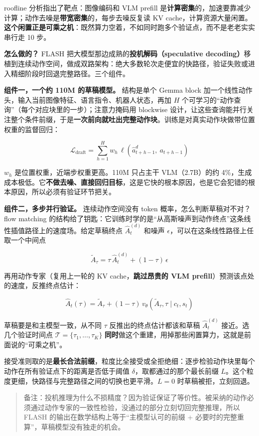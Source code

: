 \documentclass[
  chinese,
]{ctexart}
\begin{document}
roofline 分析指出了靶点：图像编码和 VLM prefill
是\textbf{计算密集}的，加速要靠减少计算；动作去噪是\textbf{带宽密集}的，每步去噪反复读
KV
cache，计算资源大量闲置。\textbf{这个闲置正是可乘之机}：既然算力空着，不如同时跑多个验证点，而不是老老实实串行走
10 步。

\textbf{怎么做的？} FLASH
把大模型那边成熟的\textbf{投机解码（speculative
decoding）}移植到连续动作空间，做成双路架构：绝大多数轮次走便宜的快路径，验证失败或进入精细阶段时回退完整路径。三个组件。

\textbf{组件一，一个约 110M 的草稿模型。} 结构是单个 Gemma block
加一个线性动作头，输入当前图像特征、语言指令、机器人状态，再加 \(H\)
个可学习的``动作查询''（每个对应块里的一步）；注意力掩码用 blockwise
设计，让这些查询能并行关注整个条件前缀，于是\textbf{一次前向就吐出完整动作块}。训练是对真实动作块做带位置权重的监督回归：

\[\mathcal{L}_{\mathrm{draft}} = \sum_{h=1}^{H} w_h\,\ell\!\left(\hat{a}_{t+h-1}^{d},\ a_{t+h-1}\right)\]

\(w_h\) 是位置权重，近端步权重更高。110M 只占主干 VLM（2.7B）的约
4\%，生成成本极低。它\textbf{不做去噪、直接回归目标}，这是它快的根本原因，也是它会犯错的根本原因，所以必须有验证环节把关。

\textbf{组件二，多步并行验证。} 连续动作空间没有 token
概率，怎么判断草稿对不对？flow matching
的结构给了钥匙：它训练时学的是``从高斯噪声到动作终点''这条线性插值路径上的速度场。给定草稿终点
\(\hat{A}_t^{(d)}\) 和噪声
\(\epsilon\)，可以在这条线性路径上任取一个中间点

\[\tilde{A}_\tau = \tau\,\hat{A}_t^{(d)} + (1-\tau)\,\epsilon\]

再用动作专家（复用上一轮的 KV cache，\textbf{跳过昂贵的 VLM
prefill}）预测该点处的速度，反推终点估计：

\[\hat{A}_t(\tau) = \tilde{A}_\tau + (1-\tau)\,v_\theta\!\left(\tilde{A}_\tau, \tau \mid c_t, s_t\right)\]

草稿要是和主模型一致，从不同 \(\tau\) 反推出的终点估计都该和草稿
\(\hat{A}_t^{(d)}\) 接近。选几个验证时间点
\(\mathcal{T} = \{\tau_1, \dots, \tau_K\}\)
\textbf{同时}做这个重建，用掉那些闲置算力，这就是前面说的``可乘之机''。

接受准则取的是\textbf{最长合法前缀}，粒度比全接受或全拒绝细：逐步检验动作块里每个动作在所有验证点下的距离是否低于阈值
\(\delta\)，取都通过的那个最长前缀
\(L\)。这个粒度更细，快路径与完整路径之间的切换也更平滑。\(L = 0\)
时草稿被拒，立刻回退。

\begin{quote}
备注：投机推理为什么不损精度？因为验证保证了等价性。被采纳的动作必须通过动作专家的一致性检验，没通过的部分立刻切回完整推理，所以
FLASH 的输出在数学结构上等于``主模型认可的前缀 +
必要时的完整重算''，草稿模型没有独走的机会。
\end{quote}
\end{document}
